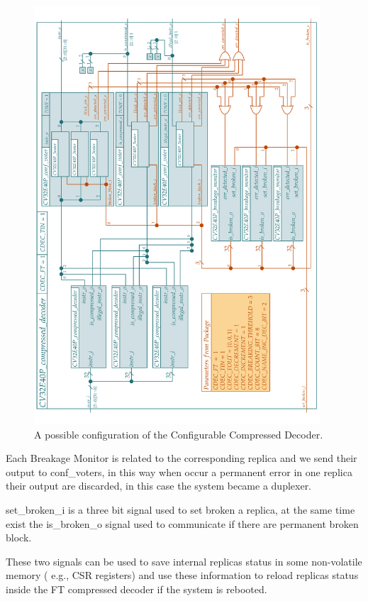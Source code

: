 {		
	    \begin{figure}[H]
    		\centering
    		\includegraphics[width=0.95\textwidth,center]{./images/cv32e40p_compressed_decoder_ft.png}
    		\caption{A possible configuration of the Configurable Compressed Decoder.}
    		\label{fig:cv32e40p_compressed_decoder_ft}
    	\end{figure} 	
    	 Each Breakage Monitor is related to the corresponding replica and we send their output to conf\_voters, in this way when occur a permanent error in one replica their output are discarded, in this case the system became a duplexer. 
    	 
    	 set\_broken\_i is a three bit signal used to set broken a replica, at the same time exist the is\_broken\_o signal used to communicate if there are permanent broken block.
    	 
    	 These two signals can be used to save internal replicas status in some non-volatile memory ( e.g., CSR registers) and use these information to reload replicas status inside the FT compressed decoder if the system is rebooted.\\
    	 
}
